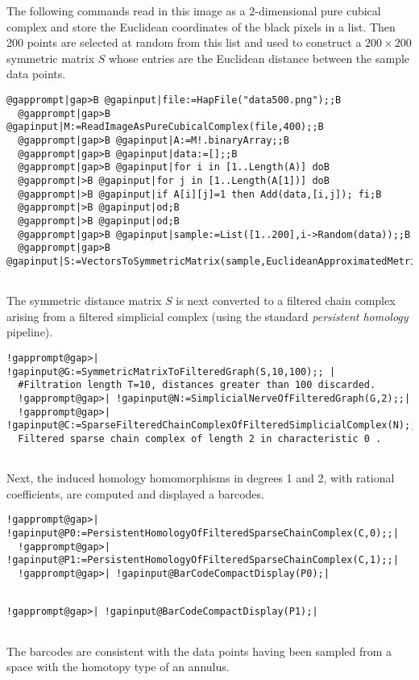 \documentclass[a4paper,11pt]{report}
\begin{document}
{{ The following commands read in this image as a $2$-dimensional pure cubical complex and store the Euclidean coordinates of the
black pixels in a list. Then 200 points are selected at random from this list
and used to construct a $200\times 200$ symmetric matrix $S$ whose entries are the Euclidean distance between the sample data points. 
\begin{Verbatim}[commandchars=@|B,fontsize=\small,frame=single,label=Example]
  @gapprompt|gap>B @gapinput|file:=HapFile("data500.png");;B
  @gapprompt|gap>B @gapinput|M:=ReadImageAsPureCubicalComplex(file,400);;B
  @gapprompt|gap>B @gapinput|A:=M!.binaryArray;;B
  @gapprompt|gap>B @gapinput|data:=[];;B
  @gapprompt|gap>B @gapinput|for i in [1..Length(A)] doB
  @gapprompt|>B @gapinput|for j in [1..Length(A[1])] doB
  @gapprompt|>B @gapinput|if A[i][j]=1 then Add(data,[i,j]); fi;B
  @gapprompt|>B @gapinput|od;B
  @gapprompt|>B @gapinput|od;B
  @gapprompt|gap>B @gapinput|sample:=List([1..200],i->Random(data));;B
  @gapprompt|gap>B @gapinput|S:=VectorsToSymmetricMatrix(sample,EuclideanApproximatedMetric);;B
  
\end{Verbatim}
 The symmetric distance matrix $S$ is next converted to a filtered chain complex arising from a filtered
simplicial complex (using the standard \emph{persistent homology} pipeline). 
\begin{Verbatim}[commandchars=!@|,fontsize=\small,frame=single,label=Example]
  !gapprompt@gap>| !gapinput@G:=SymmetricMatrixToFilteredGraph(S,10,100);; |
  #Filtration length T=10, distances greater than 100 discarded.
  !gapprompt@gap>| !gapinput@N:=SimplicialNerveOfFilteredGraph(G,2);;|
  !gapprompt@gap>| !gapinput@C:=SparseFilteredChainComplexOfFilteredSimplicialComplex(N);;|
  Filtered sparse chain complex of length 2 in characteristic 0 .
  
\end{Verbatim}
 Next, the induced homology homomorphisms in degrees 1 and 2, with rational
coefficients, are computed and displayed a barcodes. 
\begin{Verbatim}[commandchars=!@|,fontsize=\small,frame=single,label=Example]
  !gapprompt@gap>| !gapinput@P0:=PersistentHomologyOfFilteredSparseChainComplex(C,0);;|
  !gapprompt@gap>| !gapinput@P1:=PersistentHomologyOfFilteredSparseChainComplex(C,1);;|
  !gapprompt@gap>| !gapinput@BarCodeCompactDisplay(P0);|
  
\end{Verbatim}
 

 

 
\begin{Verbatim}[commandchars=!@|,fontsize=\small,frame=single,label=Example]
  !gapprompt@gap>| !gapinput@BarCodeCompactDisplay(P1);|
  
\end{Verbatim}
 

 

 The barcodes are consistent with the data points having been sampled from a
space with the homotopy type of an annulus. }

 }
\end{document}
